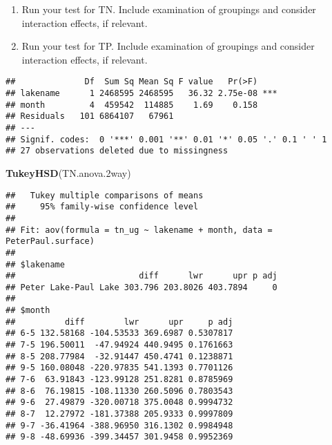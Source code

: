 \documentclass[]{article}
\newenvironment{Shaded}{\begin{snugshade}}{\end{snugshade}}
\newcommand{\CommentTok}[1]{\textcolor[rgb]{0.56,0.35,0.01}{\textit{#1}}}
\newcommand{\DataTypeTok}[1]{\textcolor[rgb]{0.13,0.29,0.53}{#1}}
\newcommand{\FloatTok}[1]{\textcolor[rgb]{0.00,0.00,0.81}{#1}}
\newcommand{\KeywordTok}[1]{\textcolor[rgb]{0.13,0.29,0.53}{\textbf{#1}}}
\newcommand{\NormalTok}[1]{#1}
\newcommand{\OperatorTok}[1]{\textcolor[rgb]{0.81,0.36,0.00}{\textbf{#1}}}
\newcommand{\StringTok}[1]{\textcolor[rgb]{0.31,0.60,0.02}{#1}}
\begin{document}
\begin{enumerate}
\def\labelenumi{\arabic{enumi}.}
\setcounter{enumi}{4}
\item
  Run your test for TN. Include examination of groupings and consider
  interaction effects, if relevant.
\item
  Run your test for TP. Include examination of groupings and consider
  interaction effects, if relevant.
\end{enumerate}

\begin{Shaded}
\end{Shaded}

\begin{verbatim}
##              Df  Sum Sq Mean Sq F value   Pr(>F)    
## lakename      1 2468595 2468595   36.32 2.75e-08 ***
## month         4  459542  114885    1.69    0.158    
## Residuals   101 6864107   67961                     
## ---
## Signif. codes:  0 '***' 0.001 '**' 0.01 '*' 0.05 '.' 0.1 ' ' 1
## 27 observations deleted due to missingness
\end{verbatim}

\begin{Shaded}
\begin{Highlighting}[]
\KeywordTok{TukeyHSD}\NormalTok{(TN.anova}\FloatTok{.2}\NormalTok{way)}
\end{Highlighting}
\end{Shaded}

\begin{verbatim}
##   Tukey multiple comparisons of means
##     95% family-wise confidence level
## 
## Fit: aov(formula = tn_ug ~ lakename + month, data = PeterPaul.surface)
## 
## $lakename
##                         diff      lwr      upr p adj
## Peter Lake-Paul Lake 303.796 203.8026 403.7894     0
## 
## $month
##          diff        lwr      upr     p adj
## 6-5 132.58168 -104.53533 369.6987 0.5307817
## 7-5 196.50011  -47.94924 440.9495 0.1761663
## 8-5 208.77984  -32.91447 450.4741 0.1238871
## 9-5 160.08048 -220.97835 541.1393 0.7701126
## 7-6  63.91843 -123.99128 251.8281 0.8785969
## 8-6  76.19815 -108.11330 260.5096 0.7803543
## 9-6  27.49879 -320.00718 375.0048 0.9994732
## 8-7  12.27972 -181.37388 205.9333 0.9997809
## 9-7 -36.41964 -388.96950 316.1302 0.9984948
## 9-8 -48.69936 -399.34457 301.9458 0.9952369
\end{verbatim}
\end{document}
